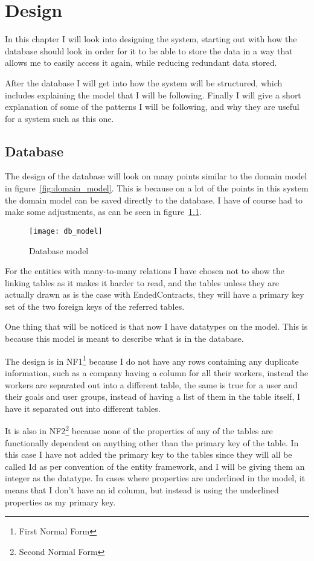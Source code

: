 \chapter{Design}
\label{chap:Design}
In this chapter I will look into designing the system, starting out with how the database should look in order for it to be able to store the data in a way that allows me to easily access it again, while reducing redundant data stored.

After the database I will get into how the system will be structured, which includes explaining the model that I will be following. Finally I will give a short explanation of some of the patterns I will be following, and why they are useful for a system such as this one.

\section{Database}
\label{sec:Database}
The design of the database will look on many points similar to the domain model in figure~\ref{fig:domain_model}. This is because on a lot of the points in this system the domain model can be saved directly to the database. I have of course had to make some adjustments, as can be seen in figure~\ref{fig:Database model}.

\begin{figure}
  \texttt{[image: db\_model]}
  \caption{Database model}
  \label{fig:Database model}
\end{figure}

For the entities with many-to-many relations I have chosen not to show the linking tables as it makes it harder to read, and the tables unless they are actually drawn as is the case with EndedContracts, they will have a primary key set of the two foreign keys of the referred tables.

One thing that will be noticed is that now I have datatypes on the model. This is because this model is meant to describe what is in the database.

The design is in NF1\footnote{First Normal Form} because I do not have any rows containing any duplicate information, such as a company having a column for all their workers, instead the workers are separated out into a different table\cite[p.~430]{DB_systems}, the same is true for a user and their goals and user groups, instead of having a list of them in the table itself, I have it separated out into different tables.

It is also in NF2\footnote{Second Normal Form} because none of the properties of any of the tables are functionally dependent on anything other than the primary key of the table\cite[p.~434]{DB_systems}. In this case I have not added the primary key to the tables since they will all be called Id as per convention of the entity framework, and I will be giving them an integer as the datatype. In cases where properties are underlined in the model, it means that I don't have an id column, but instead is using the underlined properties as my primary key.


